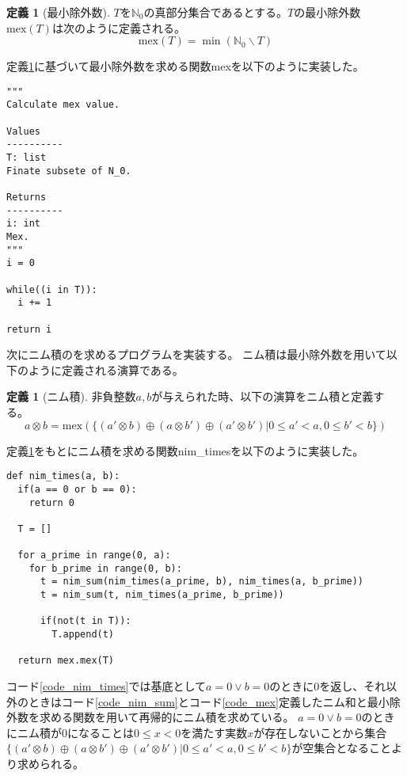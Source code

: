 \documentclass[uplatex,dvipdfmx,a4paper,10pt]{jsarticle}
\theoremstyle{definition}
\newtheorem{dfn}[thm]{定義}
\begin{document}
\begin{dfn}[最小除外数]
\(T\)を\(\mathbb{N}_0\)の真部分集合であるとする。\(T\)の最小除外数\(\text{mex}(T)\)は次のように定義される。
\begin{equation}
\text{mex}(T) = \min(\mathbb{N}_0 \backslash T)
\end{equation}
\label{dfn_mex}
\end{dfn}

定義\ref{dfn_mex}に基づいて最小除外数を求める関数mexを以下のように実装した。

\begin{lstlisting}[caption={最小除外数を求める関数}, label=code_mex]
"""
Calculate mex value.

Values
----------
T: list
Finate subsete of N_0.

Returns
----------
i: int
Mex.
"""
i = 0

while((i in T)):
  i += 1

return i
\end{lstlisting}

次にニム積のを求めるプログラムを実装する。
ニム積は最小除外数を用いて以下のように定義される演算である。

\begin{dfn}[ニム積]
非負整数\(a, b\)が与えられた時、以下の演算をニム積と定義する。
\begin{equation}
a \otimes b = \text{mex}(\{(a' \otimes b) \oplus (a \otimes b') \oplus (a' \otimes b') | 0 \leq a' < a, 0 \leq b' < b\})
\end{equation}
\label{dfn_nim_times}
\end{dfn}

定義\ref{dfn_nim_times}をもとにニム積を求める関数nim\_timesを以下のように実装した。

\begin{lstlisting}[caption={ニム積を求める関数}, label=code_nim_times]
def nim_times(a, b):
  if(a == 0 or b == 0):
    return 0
  
  T = []
  
  for a_prime in range(0, a):
    for b_prime in range(0, b):
      t = nim_sum(nim_times(a_prime, b), nim_times(a, b_prime))
      t = nim_sum(t, nim_times(a_prime, b_prime))

      if(not(t in T)):
        T.append(t)

  return mex.mex(T)
\end{lstlisting}

コード\ref{code_nim_times}では基底として\(a = 0 \lor b = 0\)のときに\(0\)を返し、それ以外のときはコード\ref{code_nim_sum}とコード\ref{code_mex}定義したニム和と最小除外数を求める関数を用いて再帰的にニム積を求めている。
\(a = 0 \lor b = 0\)のときにニム積が\(0\)になることは\(0 \leq x < 0\)を満たす実数\(x\)が存在しないことから集合\(\{(a' \otimes b) \oplus (a \otimes b') \oplus (a' \otimes b') | 0 \leq a' < a, 0 \leq b' < b\}\)が空集合となることより求められる。\\
\end{document}
